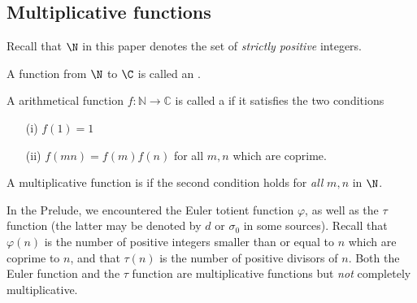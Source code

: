 \documentclass[a4paper]{article}
\begin{document}
\subsection{Multiplicative functions}

Recall that $\N$ in this paper denotes the set of \emph{strictly positive} integers.

\begin{definition}
A function from $\N$ to $\C$ is called an .
\end{definition}

\begin{definition} \label{def:multiplicative}
A arithmetical function $f: \mathbb{N} \to \mathbb{C}$ is called a  if it satisfies the two conditions
\begin{itemize}
\item[(i)] $f(1) = 1$
\item[(ii)] $f(mn) = f(m) f(n)$ for all $m, n$ which are coprime.
\end{itemize}
A multiplicative function is  if the second condition holds for \emph{all} $m, n$ in $\N$. 

\end{definition}



\begin{example}
In the Prelude, we encountered the Euler totient function $\varphi$, as well as the $\tau$ function (the latter may be denoted by $d$ or $\sigma_0$ in some sources). Recall that $\varphi(n)$ is the number of positive integers smaller than or equal to $n$ which are coprime to $n$, and that $\tau(n)$ is the number of positive divisors of $n$. Both the Euler function and the $\tau$ function are multiplicative functions but \emph{not} completely multiplicative.
\end{example}
\end{document}
